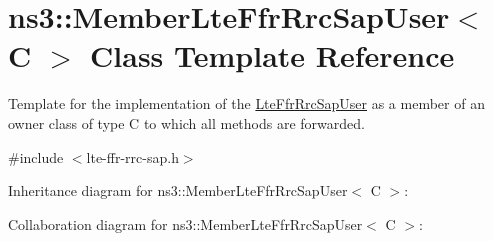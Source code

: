 \hypertarget{classns3_1_1MemberLteFfrRrcSapUser}{}\section{ns3\+:\+:Member\+Lte\+Ffr\+Rrc\+Sap\+User$<$ C $>$ Class Template Reference}
\label{classns3_1_1MemberLteFfrRrcSapUser}


Template for the implementation of the \hyperlink{classns3_1_1LteFfrRrcSapUser}{Lte\+Ffr\+Rrc\+Sap\+User} as a member of an owner class of type C to which all methods are forwarded.  




{\ttfamily \#include $<$lte-\/ffr-\/rrc-\/sap.\+h$>$}



Inheritance diagram for ns3\+:\+:Member\+Lte\+Ffr\+Rrc\+Sap\+User$<$ C $>$\+:


Collaboration diagram for ns3\+:\+:Member\+Lte\+Ffr\+Rrc\+Sap\+User$<$ C $>$\+:
